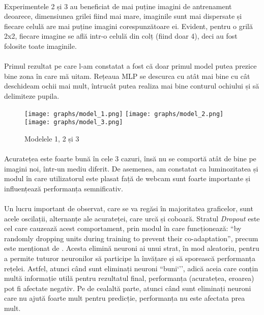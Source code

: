 \paragraph{}
Experimentele 2 și 3 au beneficiat de mai puține imagini de antrenament deoarece, dimensiunea grilei fiind mai mare, imaginile sunt mai dispersate și fiecare celulă are mai puține imagini corespunzătoare ei.
Evident, pentru o grilă 2x2, fiecare imagine se află intr-o celulă din colț (fiind doar 4), deci au fost folosite toate imaginile.

\paragraph{}
Primul rezultat pe care l-am constatat a fost că doar primul model putea prezice bine zona în care mă uitam.
Rețeaua MLP se descurca cu atât mai bine cu cât deschideam ochii mai mult, întrucât putea realiza mai bine conturul ochiului și să delimiteze pupila.

\begin{figure}[ht]
    \centering
    \texttt{[image: graphs/model\_1.png]}
    \texttt{[image: graphs/model\_2.png]}
    \texttt{[image: graphs/model\_3.png]}
    \caption{Modelele 1, 2 și 3}
\end{figure}

\paragraph{}
Acuratețea este foarte bună în cele 3 cazuri, însă nu se comportă atât de bine pe imagini noi, într-un mediu diferit.
De asemenea, am constatat ca luminozitatea și modul în care utilizatorul este plasat față de webcam sunt foarte importante și influențează performanța semnificativ.

\paragraph{}
Un lucru important de observat, care se va regăsi în majoritatea graficelor, sunt acele oscilații, alternanțe ale acurateței, care urcă și coboară.
Stratul \emph{Dropout} este cel care cauzează acest comportament, prin modul în care funcționează: ``by randomly dropping units during training to prevent their co-adaptation'', precum este menționat de \cite{dropout_algorithm}.
Acesta elimină neuroni ai unui strat, în mod aleatoriu, pentru a permite tuturor neuronilor să participe la învățare și să sporească performanța rețelei.
Astfel, atunci când sunt eliminați neuroni ``buni`'', adică aceia care conțin multă informație utilă pentru rezultatul final, performanța (acuratețea, eroarea) pot fi afectate negativ.
Pe de cealaltă parte, atunci când sunt eliminați neuroni care nu ajută foarte mult pentru predicție, performanța nu este afectata prea mult.

